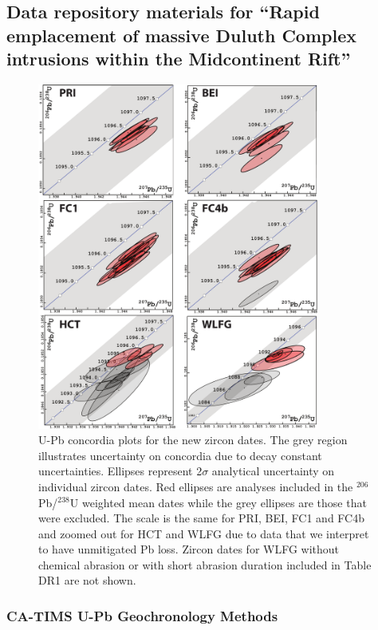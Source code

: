 \documentclass[11pt,letterpaper]{article}
\begin{document}
\subsection*{Data repository materials for ``Rapid emplacement of massive Duluth Complex intrusions within the Midcontinent Rift''}

\renewcommand{\thefigure}{DR\arabic{figure}}
\begin{figure}[!ht]
\noindent\includegraphics[width=0.825\textwidth]{./repository/Concordia_Plots.pdf}
\centering
\caption{\small{U-Pb concordia plots for the new zircon dates. The grey region illustrates uncertainty on concordia due to decay constant uncertainties. Ellipses represent  2$\sigma$ analytical uncertainty on individual zircon dates. Red ellipses are analyses included in the $^{206}$Pb/$^{238}$U weighted mean dates while the grey ellipses are those that were excluded. The scale is the same for PRI, BEI, FC1 and FC4b and zoomed out for HCT and WLFG due to data that we interpret to have unmitigated Pb loss. Zircon dates for WLFG without chemical abrasion or with short abrasion duration included in Table DR1 are not shown.}}
\label{fig:map}
\end{figure}

\subsubsection*{CA-TIMS U-Pb Geochronology Methods}
\end{document}
